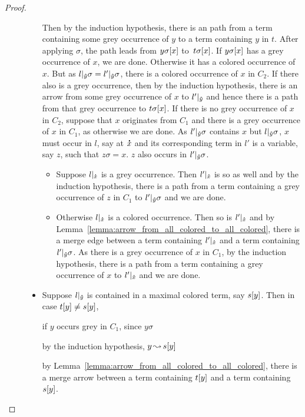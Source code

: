 \documentclass[,%
	paper=a4,%
	DIV11, %
	twoside=false,%
	liststotoc,
	bibtotoc,
	draft=false,%
	numbers=noendperiod
]{scrartcl}
\begin{document}
\begin{proof}
\begin{description}
\begin{itemize}
					Then by the induction hypothesis, there is an path from a term containing some grey occurrence of $y$ to a term containing $y$ in $t$.
					After applying $\sigma$, the path leads from $y\sigma[x]$ to~$t\sigma[x]$.
					If $y\sigma[x]$ has a grey occurrence of $x$, we are done.
					Otherwise it has a colored occurrence of $x$.
					But as $l|_{\bm\hat y}\sigma = l'|_{\bm\hat y}\sigma$, there is a colored occurrence of $x$ in $C_2$. 
					If there also is a grey occurrence, then by the induction hypothesis, there is an arrow from some grey occurrence of $x$ to $l'|_{\bm\hat y}$ and hence there is a path from that grey occurrence to $t\sigma[x]$.
					If there is no grey occurrence of $x$ in $C_2$, suppose that $x$ originates from $C_1$ and there is a grey occurrence of $x$ in $C_1$, as otherwise we are done.
					As $l'|_{\bm\hat y}\sigma$ contains $x$ but $l|_{\bm\hat y}\sigma$, $x$ must occur in $l$, say at $\bm\dot x$ and its corresponding term in $l'$ is a variable, say $z$, such that $z\sigma = x$.
					$z$ also occurs in $l'|_{\bm\hat y}\sigma$.
					\begin{itemize}
						\item
							Suppose $l|_{\bm\dot x}$ is a grey occurrence. Then $l'|_{\bm\dot x}$ is so as well and by the induction hypothesis, there is a path from a term containing a grey occurrence of $z$ in $C_1$ to $l'|_{\bm\hat y}\sigma$ and we are done.
						\item
							Otherwise $l|_{\bm\dot x}$ is a colored occurrence.
							Then so is $l'|_{\bm\dot x}$ and by Lemma~\ref{lemma:arrow_from_all_colored_to_all_colored}, there is a merge edge between a term containing $l'|_{\bm\dot x}$ and a term containing $l'|_{\bm\hat y}\sigma$.
							As there is a grey occurrence of $x$ in $C_1$, by the induction hypothesis, there is a path from a term containing a grey occurrence of $x$ to $l'|_{\bm\dot x}$ and we are done.
					\end{itemize}



				\item Suppose $l|_{\bm\hat y}$ is contained in a maximal colored term, say $s[y]$.
					\cbstart
					Then in case $t\occ{y} \neq\nolinebreak s\occ{y}$,

					if $y$ occurs grey in $C_1$, since $y\sigma$ 

					by the induction hypothesis, $y\operatorname{\leadsto} s[y]$


					by Lemma~\ref{lemma:arrow_from_all_colored_to_all_colored},
					there is a merge arrow between a term containing $t[y]$ and a term containing $s[y]$.
					\cbend


\end{itemize}
\end{description}
\end{proof}
\end{document}
